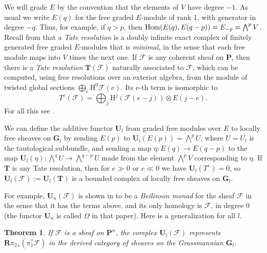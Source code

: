 \documentclass{jams-l}
\newtheorem{theorem}{Theorem}[section]
\theoremstyle{definition}
\theoremstyle{remark}
\newcommand{\F}{{\mathcal F}}
\newcommand{\GG}{{\mathbf G}}
\newcommand{\Hrm}{{\mathrm H}}
\newcommand{\PP}{{\mathbf P}}
\newcommand{\RR}{{\mathbf R}}
\newcommand{\TT}{{\mathbf T}}
\newcommand{\UU}{{\mathbf U}}
\newcommand{\Hom}{{\mathop{\rm Hom}\nolimits}}
\begin{document}
We will grade $E$ by the convention that the elements of $V$ have
degree $-1$. As usual we write $E(q)$ for the free graded $E$-module
of rank 1, with generator in degree $-q$. Thus, for example, if $q>p$, then
$\Hom(E(q), E(q-p))=E_{-p}=\bigwedge^pV$. Recall from 
\cite{Eisenbudetal.2001} that a {\it Tate resolution\/}
is a doubly infinite exact complex of finitely generated free
graded $E$-modules that is {\it minimal,\/} in the sense that each free
module maps into $V$ times the next one.
If $\F$ is any
coherent sheaf on $\PP$, then there is a 
{\it Tate resolution\/} $\TT(\F)$ naturally
associated to $\F$, which can be computed,
using free resolutions over an exterior algebra, from the 
module of twisted global sections $\bigoplus_e \Hrm^0\F(e)$. Its
$e$-th term is isomorphic to
\[
T^e(\F) = \bigoplus_j\Hrm^j(\F(e-j))\otimes E(j-e).
\]
For all this see \cite{Eisenbudetal.2001}.

We can define the additive functor $\UU_l$ from graded free 
modules over $E$ to locally free sheaves on $\GG_{l}$
 by sending $E(p)$ to
$\UU_l(E(p)) = \bigwedge^p U$, where $U=U_l$ is the tautological
subbundle, and 
sending a map $\eta: E(q)\to E(q-p)$ to the map 
$\UU_l(\eta): \bigwedge^{q} U \to \bigwedge^{q-p} U$ made from
the element $\bigwedge^pV$ corresponding to $\eta$.
If $\TT$ is any Tate resolution,  then
for $e\gg 0$ or $e\ll 0$ we have $\UU_l(T^e)=0$, so
$\UU_l(\F):= \UU_l(\TT)$
is a bounded complex of locally free sheaves
on $\GG_l.$ 

For example, $\UU_{n}(\F)$ is 
shown in \cite{Eisenbudetal.2001}
to be a {\it Beilinson
monad\/} for the sheaf $\F$ in the sense that it has the terms above,
and its only homology is $\F$, in degree 0 
(the functor $\UU_{n}$ is called $\Omega$ in that paper).
Here is a generalization for all $l$.

\begin{theorem}\label{incidence complex}
If $\F$  is a sheaf on $\PP^n$,  the complex
$\UU_l(\F)$ represents $\RR{\pi_2}_*(\pi_1^* \F)$ in the 
derived category of sheaves on the Grassmannian $\GG_l$.
\end{theorem}
\end{document}
